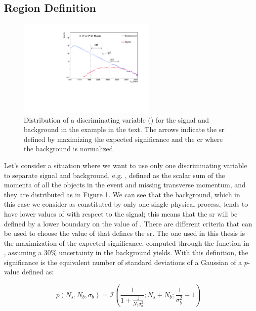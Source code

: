 \subsection{Region Definition}
\label{sec:example_sr}

\begin{figure}[h]
\centering 
\includegraphics[width=0.6\textwidth]{produce_plots/stat/sig_bkg_CR.pdf}
\caption{Distribution of a discriminating variable (\meff) for the signal and background in the example in the text. 
The arrows indicate the \gls{sr} defined by maximizing the expected significance and the \gls{cr} where the background is normalized. 
}
\label{fig:stat:example}
\end{figure}

Let's consider a situation where we want to use only one discriminating variable to separate signal and background, e.g. \meff, defined as the scalar sum of the momenta of all the objects in the event and missing transverse momentum, 
and they are distributed as in Figure \ref{fig:stat:example}. 
We can see that the background, which in this case we consider as constituted by only one single physical process, 
tends to have lower values of \meff with respect to the signal; 
this means that the \gls{sr} will be defined by a lower boundary on the value of \meff.
There are different criteria that can be used to choose the value of \meff that defines the \gls{sr}. 
The one used in this thesis is the maximization of the expected significance, computed through the function \binexpZ in \roostats \cite{Moneta:2010pm}, 
assuming a 30\% uncertainty in the background yields. With this definition, the significance is the equivalent number of standard deviations of a Gaussian of a $p$-value defined as:

\begin{equation}
\label{eq:binomexpp}
p(N_s, N_b, \sigma_b) = \mathcal{I} \left( \frac{1}{1+ \frac{1}{N_b \sigma_b^2}}; N_s + N_b; \frac{1}{\sigma_b^2} +1  \right)
\end{equation}

